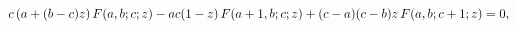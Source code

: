 \[c\left(a+(b-c)z\right)\mathop{F\/}\nolimits\!\left(a,b;c;z\right)-ac(1-z)%
\mathop{F\/}\nolimits\!\left(a+1,b;c;z\right)+(c-a)(c-b)z\mathop{F\/}\nolimits%
\!\left(a,b;c+1;z\right)=0,\]